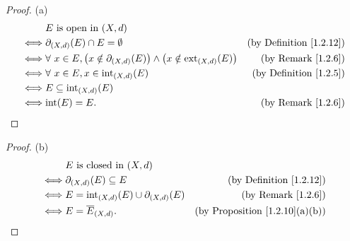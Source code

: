 \begin{proof}{(a)}
    \begin{align*}
             & E \text{ is open in } (X, d)                                                                                                                    \\
        \iff & \partial_{(X, d)}(E) \cap E = \emptyset                                                                   & \text{(by Definition \ref{1.2.12})} \\
        \iff & \forall\ x \in E, \big(x \notin \partial_{(X, d)}(E)\big) \land \big(x \notin \text{ext}_{(X, d)}(E)\big) & \text{(by Remark \ref{1.2.6})}      \\
        \iff & \forall\ x \in E, x \in \text{int}_{(X, d)}(E)                                                            & \text{(by Definition \ref{1.2.5})}  \\
        \iff & E \subseteq \text{int}_{(X, d)}(E)                                                                                                              \\
        \iff & \text{int}(E) = E.                                                                                        & \text{(by Remark \ref{1.2.6})}
    \end{align*}
\end{proof}

\begin{proof}{(b)}
    \begin{align*}
             & E \text{ is closed in } (X, d)                                                                    \\
        \iff & \partial_{(X, d)}(E) \subseteq E                     & \text{(by Definition \ref{1.2.12})}        \\
        \iff & E = \text{int}_{(X, d)}(E) \cup \partial_{(X, d)}(E) & \text{(by Remark \ref{1.2.6})}             \\
        \iff & E = \overline{E}_{(X, d)}.                           & \text{(by Proposition \ref{1.2.10}(a)(b))}
    \end{align*}
\end{proof}

